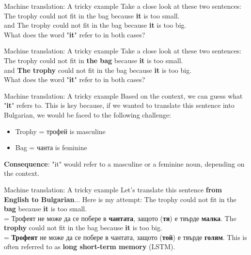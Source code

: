 \documentclass{beamer}
\begin{document}
\begin{frame}{Machine translation: A tricky example}
Take a close look at these two sentences:
\pause
\vfill
The trophy could not fit in the bag because \textbf{it} is too small. \\
\vfill
and
\vfill
The trophy could not fit in the bag because \textbf{it} is too big. \\
\pause
\vfill
What does the word "\textbf{it}" refer to in both cases?
\end{frame}

\begin{frame}{Machine translation: A tricky example}
Take a close look at these two sentences:
\vfill
The trophy could not fit in {\color{blue}\textbf{the bag}} because {\color{blue}\textbf{it}} is too small. \\
\vfill
and
\vfill
{\color{red}\textbf{The trophy}} could not fit in the bag because {\color{red}\textbf{it}} is too big. \\
\vfill
What does the word "\textbf{it}" refer to in both cases?
\end{frame}

\begin{frame}{Machine translation: A tricky example}
Based on the context, we can guess what "\textbf{it}" refers to.
\vfill
\pause
This is key because, if we wanted to translate this sentence into Bulgarian, we would be faced to the following challenge:
\begin{itemize}
	\item {\color{red}Trophy = трофей} is {\color{red}masculine}
	\item {\color{blue}Bag = чанта} is {\color{blue}feminine}
\end{itemize}
\vfill
\pause
\textbf{Consequence}: "it" would refer to a masculine or a feminine noun, depending on the context.
\end{frame}

\begin{frame}{Machine translation: A tricky example}
Let's translate this sentence \textbf{from English to Bulgarian}... Here is my attempt:
\pause
\vfill
The trophy could not fit in the {\color{blue}\textbf{bag}} because {\color{blue}\textbf{it}} is too small. \\ \pause
= Трофеят не може да се побере в {\color{blue}\textbf{чантата}}, защото ({\color{blue}\textbf{тя}}) е твърде {\color{blue}\textbf{малка}}.
\pause
\vfill
The {\color{red}\textbf{trophy}} could not fit in the bag because {\color{red}\textbf{it}} is too big. \\ \pause
= {\color{red}\textbf{Трофеят}} не може да се побере в чантата, защото ({\color{red}\textbf{той}}) е твърде {\color{red}\textbf{голям}}.
\pause
\vfill
This is often referred to as \textbf{long short-term memory} (LSTM).
\end{frame}
\end{document}
